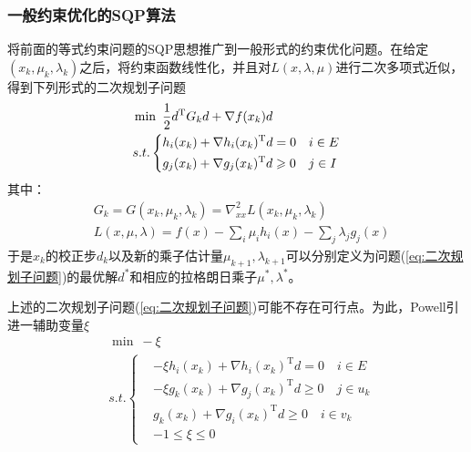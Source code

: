         \subsubsection{一般约束优化的SQP算法}
            \par
            将前面的等式约束问题的SQP思想推广到一般形式的约束优化问题。在给定$(x_k,{\mu}_k,{\lambda}_k)$之后，将约束函数线性化，并且对$L(x,\lambda,\mu)$进行二次多项式近似，得到下列形式的二次规划子问题
            \begin{align}
            \label{eq:二次规划子问题}
            &\mathop {\min}\  \frac 12 d^\mathrm{T} G_kd+\nabla f(x_k)d\\
            &s.t.\left\{
            \begin{aligned}
            &h_i(x_k)+\nabla h_i(x_k)^\mathrm{T} d=0\quad i \in E\\
            &g_j(x_k)+\nabla g_j(x_k)^\mathrm{T} d \geqslant 0\quad j \in I
            \end{aligned}
            \right.\notag
            \end{align}
            其中：
            \begin{align*}
            &G_k=G(x_k,{\mu}_k,{\lambda}_k)={\nabla}_{xx}^2L(x_k,{\mu}_k,{\lambda}_k)\\
            &L(x,\mu,\lambda)=f(x)-\mathop{\sum}_i{\mu}_ih_i(x)-\mathop{\sum}_j{\lambda}_jg_j(x)
            \end{align*}
            于是$x_k$的校正步$d_k$以及新的乘子估计量${\mu}_{k+1},{\lambda}_{k+1}$可以分别定义为问题(\ref{eq:二次规划子问题})的最优解$d^*$和相应的拉格朗日乘子${\mu}^*,{\lambda}^*$。
            \par
            上述的二次规划子问题(\ref{eq:二次规划子问题})可能不存在可行点。为此，Powell引进一辅助变量$\xi$
            \begin{align*}
            &\mathop {\min} \ -\xi\\
            &s.t.\left\{
            \begin{aligned}
            &-{\xi}h_i(x_k)+\nabla h_i(x_k)^\mathrm{T} d=0\quad i \in E\\
            &-{\xi}g_k(x_k)+\nabla g_j(x_k)^\mathrm{T} d \geqslant 0\quad j \in u_k\\
            &g_k(x_k)+\nabla g_i(x_k)^\mathrm{T} d \geqslant 0\quad i \in v_k\\
            &-1 \leqslant \xi \leqslant 0
            \end{aligned}
            \right.
            \end{align*}
